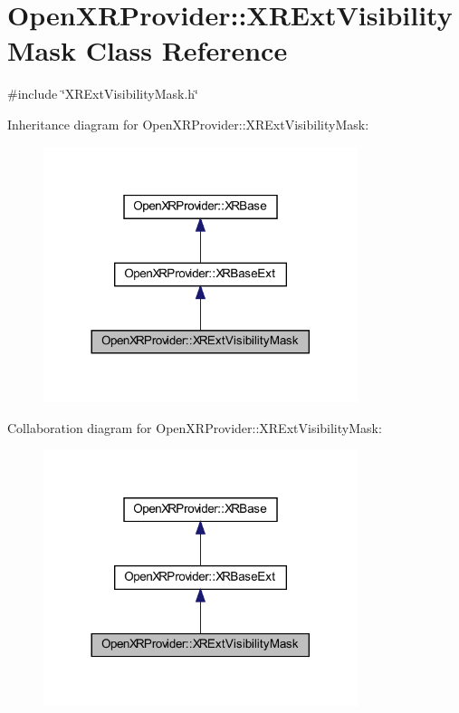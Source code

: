 \hypertarget{class_open_x_r_provider_1_1_x_r_ext_visibility_mask}{}\section{Open\+X\+R\+Provider\+::X\+R\+Ext\+Visibility\+Mask Class Reference}
\label{class_open_x_r_provider_1_1_x_r_ext_visibility_mask}


{\ttfamily \#include \char`\"{}X\+R\+Ext\+Visibility\+Mask.\+h\char`\"{}}



Inheritance diagram for Open\+X\+R\+Provider\+::X\+R\+Ext\+Visibility\+Mask\+:\nopagebreak
\begin{figure}[H]
\begin{center}
\leavevmode
\includegraphics[width=260pt]{class_open_x_r_provider_1_1_x_r_ext_visibility_mask__inherit__graph}
\end{center}
\end{figure}


Collaboration diagram for Open\+X\+R\+Provider\+::X\+R\+Ext\+Visibility\+Mask\+:\nopagebreak
\begin{figure}[H]
\begin{center}
\leavevmode
\includegraphics[width=260pt]{class_open_x_r_provider_1_1_x_r_ext_visibility_mask__coll__graph}
\end{center}
\end{figure}
